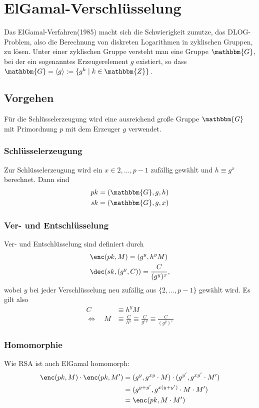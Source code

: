 \section{ElGamal-Verschlüsselung}
\label{ch:asymenc:elgamal} Das ElGamal-Verfahren\indexElGamal (1985)
macht sich die Schwierigkeit zunutze, das DLOG-Problem\indexDLOGProblem,
also die Berechnung von diskreten Logarithmen in zyklischen Gruppen, zu
lösen. Unter einer zyklischen Gruppe versteht man eine Gruppe
$\mathbbm{G}$, bei der ein sogenanntes Erzeugerelement $g$ existiert, so
dass $\mathbbm{G} = \langle g \rangle := \{g^k \mid k \in
\mathbbm{Z}\}$.

\subsection{Vorgehen} Für die Schlüsselerzeugung wird eine ausreichend
große Gruppe $\mathbbm{G}$ mit Primordnung $p$ mit dem Erzeuger $g$
verwendet.
\subsubsection{Schlüsselerzeugung} Zur Schlüsselerzeugung wird ein $x
\in {2,\dots, p-1}$ zufällig gewählt und $h \equiv g^x$ berechnet. Dann
sind
\begin{align*} 
  pk &= (\mathbbm{G}, g, h)\\ sk &= (\mathbbm{G}, g, x)
\end{align*}

\subsubsection{Ver- und Entschlüsselung} Ver- und Entschlüsselung sind
definiert durch
\begin{align*} 
&\enc(pk, M) = (g^y, h^y M) \\ 
&\dec(sk, (g^y, C)) = \frac{C}{(g^y)^x},
\end{align*} 
wobei $y$ bei jeder Verschlüsselung neu zufällig aus $\{2, \dots, p-1\}$
gewählt wird. Es gilt also 
\begin{align*} 
C &\equiv h^y M \\ 
\Leftrightarrow \quad M& \equiv \frac{C}{h^y} \equiv \frac{C}{g^{xy}}
                         \equiv \frac{C}{(g^y)^x} 
\end{align*}

\subsubsection{Homomorphie}\indexElGamalHomomorphie Wie RSA ist auch
ElGamal homomorph:
\begin{align*} 
\enc({pk,M}) \cdot \enc({pk,M'}) &= (g^y, g^{xy} \cdot M)\cdot (g^{y'},
                                   g^{xy'} \cdot M')\\ 
                                 &= (g^{y+y'}, g^{x(y + y')}\cdot M  \cdot M')\\ 
                                 &= \enc({pk, M \cdot M'})
\end{align*}

